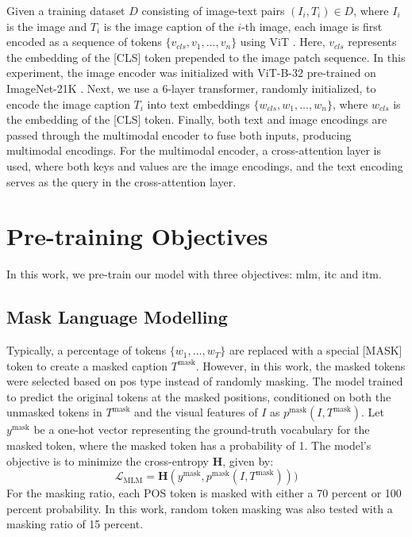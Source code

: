 Given a training dataset \(D\) consisting of image-text pairs \((I_i, T_i) \in D\), where \(I_i\) is the image and \(T_i\) is the image caption of the \(i\)-th image, each image is first encoded as a sequence of tokens \(\{v_{cls}, v_1, \dots, v_n\}\) using ViT \cite{vit}.  
Here, \(v_{cls}\) represents the embedding of the [CLS] token prepended to the image patch sequence.  
In this experiment, the image encoder was initialized with ViT-B-32 pre-trained on ImageNet-21K \cite{imagenet}.  
Next, we use a 6-layer transformer, randomly initialized, to encode the image caption \(T_i\) into text embeddings \(\{w_{cls}, w_1, \dots, w_n\}\), where \(w_{cls}\) is the embedding of the [CLS] token.  
Finally, both text and image encodings are passed through the multimodal encoder to fuse both inputs, producing multimodal encodings.  
For the multimodal encoder, a cross-attention layer is used, where both keys and values are the image encodings, and the text encoding serves as the query in the cross-attention layer.  


\section{Pre-training Objectives}
In this work, we pre-train our model with three objectives: \acrfull{mlm}, \acrfull{itc} and \acrfull{itm}.
\subsection{Mask Language Modelling}
Typically, a percentage of tokens \(\{w_1, \dots, w_T\}\) are replaced with a special [MASK] token to create a masked caption \(T^{\text{mask}}\).  
However, in this work, the masked tokens were selected based on \acrshort{pos} type instead of randomly masking.  
The model trained to predict the original tokens at the masked positions, conditioned on both the unmasked tokens in \(T^{\text{mask}}\) and the visual features of \(I\) as \(p^{\text{mask}}(I, T^{\text{mask}})\).  
Let \(y^{\text{mask}}\) be a one-hot vector representing the ground-truth vocabulary for the masked token, where the masked token has a probability of 1.  
The model’s objective is to minimize the cross-entropy \(\mathbf{H}\), given by:  
\[
    \mathcal{L}_{\text{MLM}} = \mathbf{H}(y^{\text{mask}}, p^{\text{mask}}(I, T^{\text{mask}})))
\]
For the masking ratio, each POS token is masked with either a 70 percent or 100 percent probability.
In this work, random token masking was also tested with a masking ratio of 15 percent.

